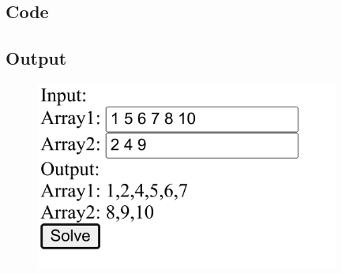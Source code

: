 \documentclass{article}
\begin{document}
\subsection*{Code}

\newpage
\subsection*{Output}
\begin{figure}[H]
    \centering
    \includegraphics[width=10cm]{5/out.png}
\end{figure}
\end{document}
